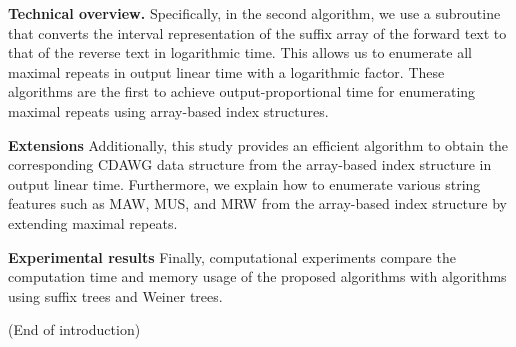 \textbf{Technical overview.}
Specifically, in the second algorithm, we use a subroutine that converts the interval representation of the suffix array of the forward text to that of the reverse text in logarithmic time. This allows us to enumerate all maximal repeats in output linear time with a logarithmic factor. These algorithms are the first to achieve output-proportional time for enumerating maximal repeats using array-based index structures. 

\textbf{Extensions}
Additionally, this study provides an efficient algorithm to obtain the corresponding CDAWG data structure from the array-based index structure in output linear time. Furthermore, we explain how to enumerate various string features such as MAW, MUS, and MRW from the array-based index structure by extending maximal repeats. 

\textbf{Experimental results}
Finally, computational experiments compare the computation time and memory usage of the proposed algorithms with algorithms using suffix trees and Weiner trees.

\medskip 
(End of introduction)


